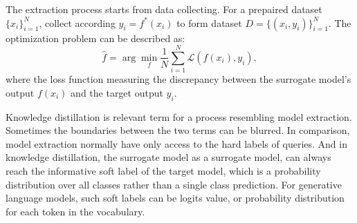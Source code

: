 The extraction process starts from data collecting. For a prepaired dataset$\{x_i\}^N_{i=1}$, collect according $y_i=f^*(x_i)$ to form dataset $D =\{(x_i,y_i)\}^N_{i=1}$. The optimization problem can be described as:
\begin{equation}
\hat{f} = \arg\min_f \frac{1}{N} \sum_{i=1}^N \mathcal{L}(f(x_i), y_i),
\end{equation}
where the loss function measuring the discrepancy between the surrogate model's output $f(x_i)$ and the target output $y_i$.

Knowledge distillation \cite{ks} is relevant term  for a process resembling model extraction. Sometimes the boundaries between the two terms can be blurred. In comparison, model extraction normally have only access to the hard labels of queries. And in knowledge distillation, the surrogate model as a surrogate model, can always reach the informative soft label of the target model, which is a probability distribution over all classes rather than a single class prediction. For generative language models, such soft labels can be logits value, or probability distribution for each token in the vocabulary.